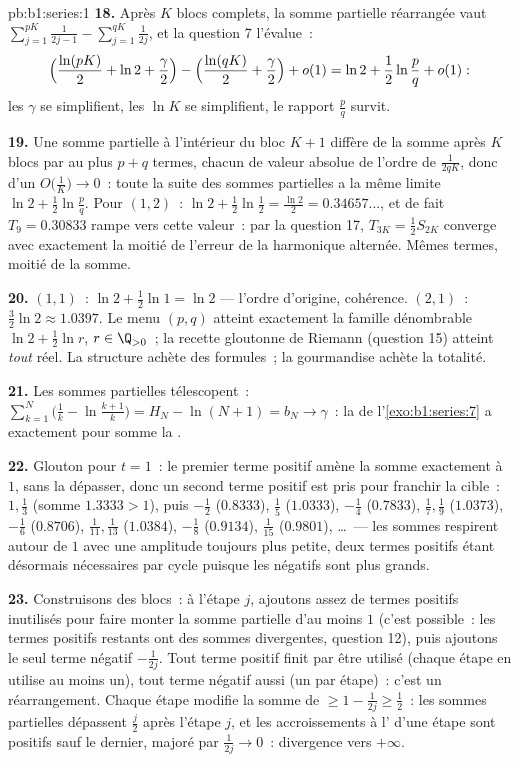 \begin{solution}{pb:b1:series:1}
\textbf{18.} Après $K$ blocs complets, la somme partielle réarrangée
vaut $\sum_{j=1}^{pK}\frac{1}{2j-1} -
\sum_{j=1}^{qK}\frac{1}{2j}$, et la question 7 l'évalue~:
\[
\Bigl(\frac{\ln(pK)}{2} + \ln 2 + \frac\gamma2\Bigr)
- \Bigl(\frac{\ln(qK)}{2} + \frac\gamma2\Bigr) + o(1)
= \ln 2 + \frac12\ln\frac pq + o(1) :
\]
les $\gamma$ se simplifient, les $\ln K$ se simplifient, le rapport
$\frac pq$ survit.

\textbf{19.} Une somme partielle à l'intérieur du bloc $K + 1$
diffère de la somme après $K$ blocs par au plus $p + q$ termes,
chacun de valeur absolue de l'ordre de $\frac{1}{2qK}$, donc d'un
$O\bigl(\frac1K\bigr) \to 0$~: toute la suite des sommes partielles a
la même limite $\ln 2 + \frac12\ln\frac pq$. Pour $(1, 2)$~: $\ln 2 +
\frac12\ln\frac12 = \frac{\ln 2}{2} = 0.34657\dots$, et de fait $T_9
= 0.30833$ rampe vers cette valeur~: par la question 17, $T_{3K} =
\frac12 S_{2K}$ converge avec exactement la moitié de l'erreur de la
 harmonique alternée. Mêmes termes, moitié de la somme.

\textbf{20.} $(1,1)$~: $\ln 2 + \frac12\ln 1 = \ln 2$ --- l'ordre
d'origine, cohérence. $(2,1)$~: $\frac32\ln 2 \approx 1.0397$. Le
menu $(p,q)$ atteint exactement la famille dénombrable  $\ln 2 +
\frac12\ln r$, $r \in \Q_{>0}$~; la recette gloutonne de Riemann
(question 15) atteint \emph{tout} réel. La structure achète des
formules~; la gourmandise achète la totalité.

\textbf{21.} Les sommes partielles télescopent~: $\sum_{k=1}^{N}
\bigl(\frac1k - \ln\frac{k+1}{k}\bigr) = H_N - \ln(N+1) = b_N
\to \gamma$~: la  de l'\cref{exo:b1:series:7} a exactement pour
somme la .

\textbf{22.} Glouton pour $t = 1$~: le premier terme positif amène la
somme exactement à $1$, sans la dépasser, donc un second terme
positif est pris pour franchir la cible~: $1, \frac13$ (somme
$1.3333 > 1$), puis $-\frac12$ ($0.8333$), $\frac15$ ($1.0333$),
$-\frac14$ ($0.7833$), $\frac17, \frac19$ ($1.0373$), $-\frac16$
($0.8706$), $\frac1{11}, \frac1{13}$ ($1.0384$), $-\frac18$
($0.9134$), $\frac1{15}$ ($0.9801$), \dots\ --- les sommes respirent
autour de $1$ avec une amplitude toujours plus petite, deux termes
positifs étant désormais nécessaires par cycle puisque les négatifs
sont plus grands.

\textbf{23.} Construisons des blocs~: à l'étape $j$, ajoutons assez
de termes positifs inutilisés pour faire monter la somme partielle
d'au moins $1$ (c'est possible~: les termes positifs restants ont des
sommes divergentes, question 12), puis ajoutons le seul terme négatif
$-\frac{1}{2j}$. Tout terme positif finit par être utilisé (chaque
étape en utilise au moins un), tout terme négatif aussi (un par
étape)~: c'est un réarrangement. Chaque étape modifie la somme de
$\geq 1 - \frac{1}{2j} \geq \frac12$~: les sommes partielles
dépassent $\frac{j}{2}$ après l'étape $j$, et les accroissements à
l' d'une étape sont positifs sauf le dernier, majoré par
$\frac{1}{2j} \to 0$~: divergence vers $+\infty$.


\end{solution}

